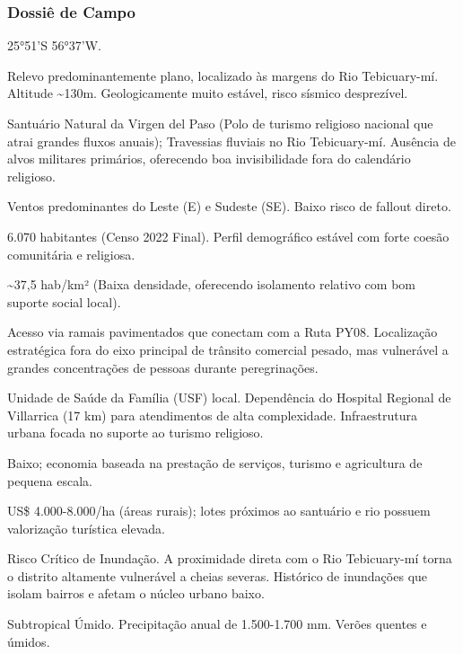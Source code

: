 \subsubsection{Dossiê de Campo}
\begin{description}[style=nextline,leftmargin=0.5cm,font=\bfseries]
\item[Coordenadas]  25°51'S 56°37'W.
\item[Topografia]  Relevo predominantemente plano, localizado às margens do Rio Tebicuary-mí. Altitude \textasciitilde 130m. Geologicamente muito estável, risco sísmico desprezível.
\item[Alvos Estratégicos]  Santuário Natural da Virgen del Paso (Polo de turismo religioso nacional que atrai grandes fluxos anuais); Travessias fluviais no Rio Tebicuary-mí. Ausência de alvos militares primários, oferecendo boa invisibilidade fora do calendário religioso.
\item[Fallout]  Ventos predominantes do Leste (E) e Sudeste (SE). Baixo risco de fallout direto.
\item[População]  6.070 habitantes (Censo 2022 Final). Perfil demográfico estável com forte coesão comunitária e religiosa.
\item[Densidade]  \textasciitilde 37,5 hab/\allowbreak km² (Baixa densidade, oferecendo isolamento relativo com bom suporte social local).
\item[Vias de Acesso]  Acesso via ramais pavimentados que conectam com a Ruta PY08. Localização estratégica fora do eixo principal de trânsito comercial pesado, mas vulnerável a grandes concentrações de pessoas durante peregrinações.
\item[Serviços]  Unidade de Saúde da Família (USF) local. Dependência do Hospital Regional de Villarrica (17 km) para atendimentos de alta complexidade. Infraestrutura urbana focada no suporte ao turismo religioso.
\item[Custo de Vida]  Baixo; economia baseada na prestação de serviços, turismo e agricultura de pequena escala.
\item[Preço da Terra]  US\$ 4.000-8.000/\allowbreak ha (áreas rurais); lotes próximos ao santuário e rio possuem valorização turística elevada.
\item[Hidrologia]  Risco Crítico de Inundação. A proximidade direta com o Rio Tebicuary-mí torna o distrito altamente vulnerável a cheias severas. Histórico de inundações que isolam bairros e afetam o núcleo urbano baixo.
\item[Clima]  Subtropical Úmido. Precipitação anual de 1.500-1.700 mm. Verões quentes e úmidos.

\end{description}

